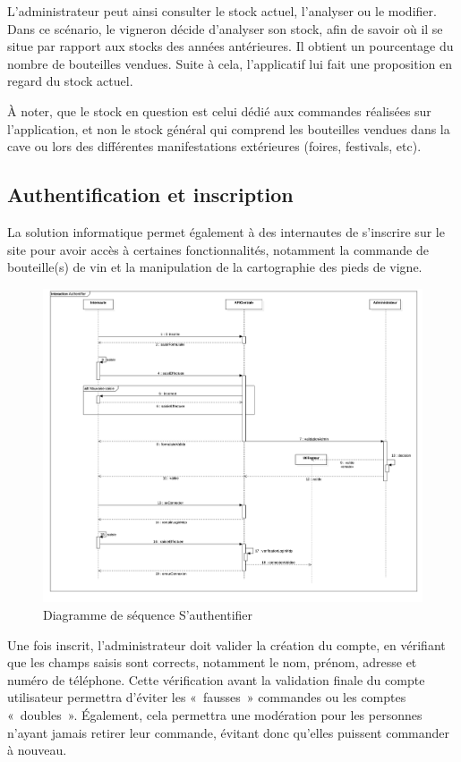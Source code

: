 \documentclass[a4paper, title]{report}
\begin{document}
L'administrateur peut ainsi consulter le stock actuel, l'analyser ou le
modifier. Dans ce scénario, le vigneron décide d'analyser son stock,
afin de savoir où il se situe par rapport aux stocks des années
antérieures. Il obtient un pourcentage du nombre de bouteilles vendues.
Suite à cela, l'applicatif lui fait une proposition en regard du stock
actuel.

À noter, que le stock en question est celui dédié aux commandes
réalisées sur l'application, et non le stock général qui comprend les
bouteilles vendues dans la cave ou lors des différentes manifestations
extérieures (foires, festivals, etc).

\subsection{Authentification et inscription}\label{authentification-et-inscription}

La solution informatique permet également à des internautes de
s'inscrire sur le site pour avoir accès à certaines fonctionnalités,
notamment la commande de bouteille(s) de vin et la manipulation de la
cartographie des pieds de vigne.

\begin{figure}
\centering
\includegraphics{Images/SequenceDiagramAuthentifier.jpg}
\caption{Diagramme de séquence S'authentifier}
\end{figure}

Une fois inscrit, l'administrateur doit valider la création du compte,
en vérifiant que les champs saisis sont corrects, notamment le nom,
prénom, adresse et numéro de téléphone. Cette vérification avant la
validation finale du compte utilisateur permettra d'éviter les
«~fausses~» commandes ou les comptes «~doubles~». Également, cela
permettra une modération pour les personnes n'ayant jamais retirer leur
commande, évitant donc qu'elles puissent commander à nouveau.
\end{document}
